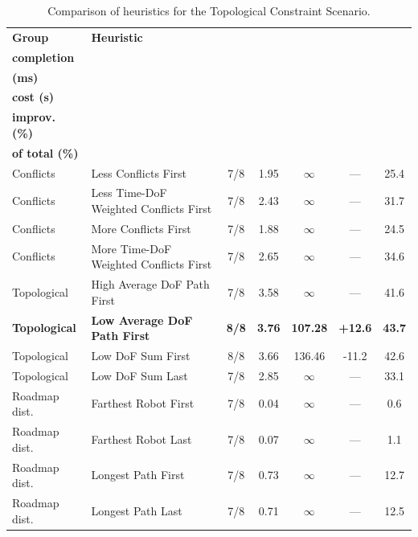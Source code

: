 \begin{table}[H]
\centering
\caption{Comparison of heuristics for the Topological Constraint Scenario.}
\label{tab:heuristics_topological_constraint}
\scriptsize
\setlength{\tabcolsep}{3pt}
\begin{tabular}{@{}llccccc@{}}
\toprule
\textbf{Group} &
\textbf{Heuristic} &
\makecell{\textbf{Robot}\\\textbf{completion}} &
\makecell{\textbf{t perm.}\\\textbf{(ms)}} &
\makecell{\textbf{Excess}\\\textbf{cost (s)}} &
\makecell{\textbf{Cost}\\\textbf{improv. (\%)}} &
\makecell{\textbf{Perm. time}\\\textbf{of total (\%)}} \\
\midrule

Conflicts & Less Conflicts First & 7/8 & 1.95 & $\infty$ & --- & 25.4 \\
Conflicts & Less Time-DoF Weighted Conflicts First & 7/8 & 2.43 & $\infty$ & --- & 31.7 \\
Conflicts & More Conflicts First & 7/8 & 1.88 & $\infty$ & --- & 24.5 \\
Conflicts & More Time-DoF Weighted Conflicts First & 7/8 & 2.65 & $\infty$ & --- & 34.6 \\

\midrule

Topological & High Average DoF Path First & 7/8 & 3.58 & $\infty$ & --- & 41.6 \\
\textbf{Topological} & \textbf{Low Average DoF Path First} & \textbf{8/8} & \textbf{3.76} & \textbf{107.28} & \textbf{+12.6} & \textbf{43.7} \\
Topological & Low DoF Sum First & 8/8 & 3.66 & 136.46 & -11.2 & 42.6 \\
Topological & Low DoF Sum Last & 7/8 & 2.85 & $\infty$ & --- & 33.1 \\

\midrule

Roadmap dist. & Farthest Robot First & 7/8 & 0.04 & $\infty$ & --- & 0.6 \\
Roadmap dist. & Farthest Robot Last & 7/8 & 0.07 & $\infty$ & --- & 1.1 \\
Roadmap dist. & Longest Path First & 7/8 & 0.73 & $\infty$ & --- & 12.7 \\
Roadmap dist. & Longest Path Last & 7/8 & 0.71 & $\infty$ & --- & 12.5 \\

\midrule


\end{tabular}
\end{table}
